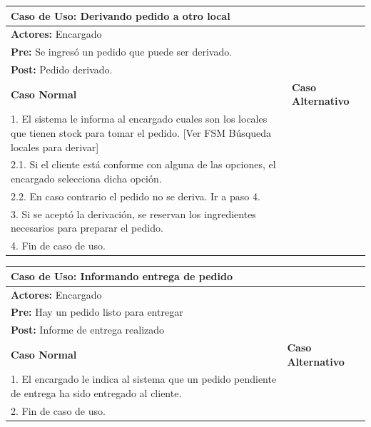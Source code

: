 \documentclass[a4paper,11pt] {article}
\begin{document}
\begin{center}
	\begin{tabular}{ | p{6.5cm} | p{6.5cm} | }
		\hline
			\multicolumn{2}{|l|}{\textbf{Caso de Uso:} Derivando pedido a otro local} \\
		\hline
			\multicolumn{2}{|l|}{\textbf{Actores:} Encargado} \\
		\hline
			\multicolumn{2}{|l|}{\textbf{Pre:} Se ingres\'o un pedido que puede ser derivado.} \\
		\hline
			\multicolumn{2}{|l|}{\textbf{Post:} Pedido derivado.} \\
		\hline
		\textbf{Caso Normal} & \textbf{Caso Alternativo}	\\
		\hline
		1. El sistema le informa al encargado cuales son los locales que tienen stock para tomar el pedido. [Ver FSM B\'usqueda locales para derivar] &	\\
		\hline
		2.1. Si el cliente est\'a conforme con alguna de las opciones, el encargado selecciona dicha opci\'on. &	\\
		\hline
		2.2. En caso contrario el pedido no se deriva. Ir a paso 4. &	\\
		\hline
		3. Si se acept\'o la derivaci\'on, se reservan los ingredientes necesarios para preparar el pedido. &	\\
		\hline
		4. Fin de caso de uso. &	\\
		\hline
	\end{tabular}
\end{center}

\begin{center}
	\begin{tabular}{ | p{6.5cm} | p{6.5cm} | }
		\hline
			\multicolumn{2}{|l|}{\textbf{Caso de Uso:} Informando entrega de pedido} \\
		\hline
			\multicolumn{2}{|l|}{\textbf{Actores:} Encargado} \\
		\hline
			\multicolumn{2}{|l|}{\textbf{Pre:} Hay un pedido listo para entregar} \\
		\hline
			\multicolumn{2}{|l|}{\textbf{Post:} Informe de entrega realizado} \\
		\hline
		\textbf{Caso Normal} & \textbf{Caso Alternativo}	\\
		\hline
		1. El encargado le indica al sistema que un pedido pendiente de entrega ha sido entregado al cliente. &	\\
		\hline
		2. Fin de caso de uso. &	\\
		\hline
	\end{tabular}
\end{center}
\end{document}
